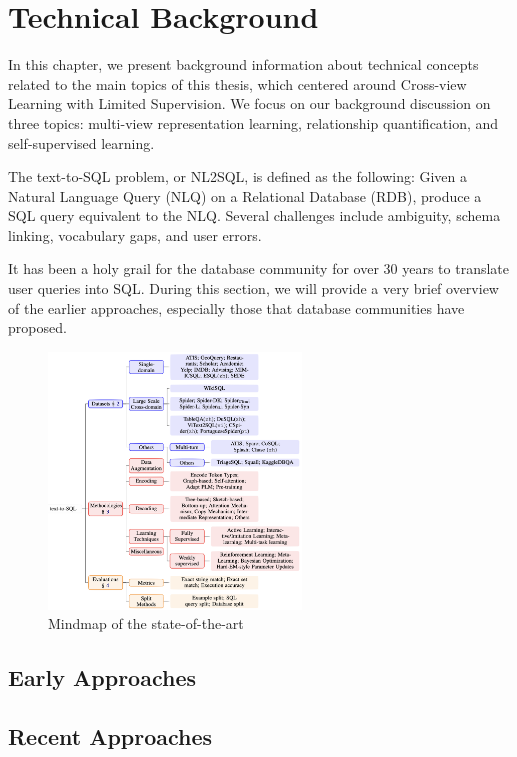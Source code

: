 \section{Technical Background}

In this chapter, we present background information about technical concepts related to the main topics
of this thesis, which centered around Cross-view Learning with Limited Supervision. We focus on our
background discussion on three topics: multi-view representation learning, relationship quantification, and
self-supervised learning.

The text-to-SQL problem, or NL2SQL, is defined as the following: Given a Natural Language Query (NLQ) on a Relational Database (RDB), produce a SQL query equivalent to the NLQ. Several challenges include ambiguity, schema linking, vocabulary gaps, and user errors.

It has been a holy grail for the database community for over 30 years to translate user queries into SQL. During this section, we will provide a very brief overview of the earlier approaches, especially those that database communities have proposed.

\begin{figure}[htb]
    \centering
    \includegraphics[width=0.6\textwidth]{pics/mindmap.png}
    \caption{Mindmap of the state-of-the-art}
    \label{fig:mindmap}
\end{figure}

\subsection{Early Approaches}

\subsection{Recent Approaches}
